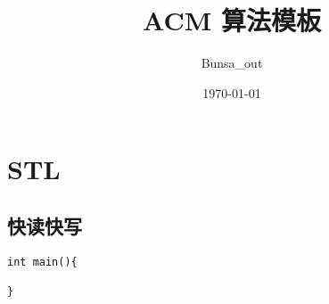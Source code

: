 \documentclass[12pt, a4paper, oneside]{ctexart}
\title{\fontsize{70}{30}\selectfont  ACM 算法模板}
\author{Bunsa\_out}
\date{\today}
\begin{document}
 






\maketitle
\thispagestyle{empty}
\centering



\newpage
\tableofcontents 
\thispagestyle{empty}
\lstset{language=C++}


\newpage 
\section{STL} 
\subsection{快读快写}

\begin{lstlisting}
int main(){

}
\end{lstlisting}
\end{document}
